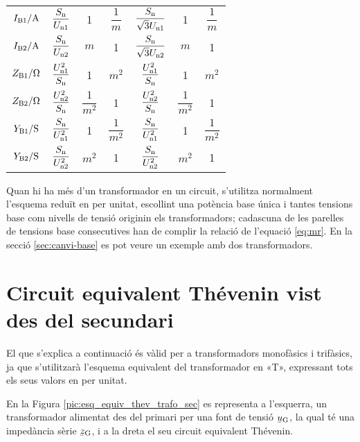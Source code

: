 \begin{ThreePartTable}
\begin{longtable}{ccccccc}
$I\ped{B1}/\si{A}$ & $\dfrac{S\ped{n}}{U\ped{n1}}$ & 1 & $\dfrac{1}{m}$ & $\dfrac{S\ped{n}}{\sqrt{3}U\ped{n1}}$ & 1  & $\dfrac{1}{m}$\\[0.4cm]
$I\ped{B2}/\si{A}$ & $\dfrac{S\ped{n}}{U\ped{n2}}$  & $m$ & 1 & $\dfrac{S\ped{n}}{\sqrt{3}U\ped{n2}}$   & $m$ & 1\\[0.4cm]
$Z\ped{B1}/\si{\ohm}$ & $\dfrac{U\ped{n1}^2}{S\ped{n}}$ & 1 & $m^2$ & $\dfrac{U\ped{n1}^2}{S\ped{n}}$ & 1 & $m^2$\\[0.4cm]
$Z\ped{B2}/\si{\ohm}$ & $\dfrac{U\ped{n2}^2}{S\ped{n}}$  & $\dfrac{1}{m^2}$ & 1& $\dfrac{U\ped{n2}^2}{S\ped{n}}$  & $\dfrac{1}{m^2}$ & 1\\[0.4cm]
$Y\ped{B1}/\si{S}$ & $\dfrac{S\ped{n}}{U\ped{n1}^2}$ & 1 & $\dfrac{1}{m^2}$ & $\dfrac{S\ped{n}}{U\ped{n1}^2}$ & 1 & $\dfrac{1}{m^2}$ \\[0.4cm]
$Y\ped{B2}/\si{S}$ & $\dfrac{S\ped{n}}{U\ped{n2}^2}$  & $m^2$ & 1 & $\dfrac{S\ped{n}}{U\ped{n2}^2}$ &$m^2$ &  1\\[0.4cm]
\bottomrule[1pt]
\end{longtable}
\end{ThreePartTable}


Quan hi ha més d'un transformador en un circuit, s'utilitza normalment l'esquema reduït en per unitat, escollint una potència base única i tantes tensions base com nivells de tensió  originin els transformadors; cadascuna de les parelles de tensions base consecutives han de complir la relació de l'equació \eqref{eq:mr}. En la secció \vref{sec:canvi-base} es pot veure un exemple amb dos transformadors.

\section{Circuit equivalent Thévenin vist des del secundari}\label{sec:trafo-thevenin}

El que s'explica a continuació és vàlid per a transformadors
monofàsics i trifàsics, ja que s'utilitzarà l'esquema equivalent del
transformador en «T», expressant tots els seus valors en per unitat.

En la Figura \vref{pic:esq_equiv_thev_trafo_sec}  es representa a
l'esquerra, un transformador alimentat des del primari per una font
de tensió $\cmplx{u}\ped{G}$, la qual té una impedància sèrie
$\cmplx{z}\ped{G}$, i a  la dreta el seu circuit equivalent
Thévenin.

\begin{center}
    
    \label{pic:esq_equiv_thev_trafo_sec}
\end{center}

